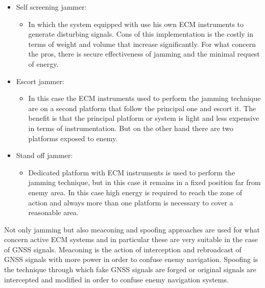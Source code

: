 \documentclass[12pt]{report}
\begin{document}
\begin{itemize}
     \item Self screening jammer: 
         \begin{itemize}
         \item In which the system equipped with use his own ECM instruments to generate disturbing signals. Cons of this implementation is the costly in terms of weight and volume that increase significantly. For what concern the pros, there is secure effectiveness of jamming and the minimal request of energy.
         \end{itemize}
    \item Escort jammer: 
         \begin{itemize}
         \item In this case the ECM instruments used to perform the jamming technique are on a second platform that follow the principal one and escort it. The benefit is that the principal platform or system is light and less expensive in terms of instrumentation. But on the other hand there are two platforms exposed to enemy.
        \end{itemize}
    \item Stand off jammer:
         \begin{itemize}
         \item Dedicated platform with ECM instruments is used to perform the jamming technique, but in this case it remains in a fixed position far from enemy area. In this case high energy is required to reach the zone of action and always more than one platform is necessary to cover a reasonable area.
         \end{itemize}
\end{itemize}
Not only jamming but also meaconing and spoofing approaches are used for what concern active ECM systems and in particular these are very suitable in the case of GNSS signals. Meaconing is the action of interception and rebroadcast of GNSS signals with more power in order to confuse enemy navigation. Spoofing is the technique through which fake GNSS signals are forged or original signals are intercepted and modified in order to confuse enemy navigation systems.
\end{document}

